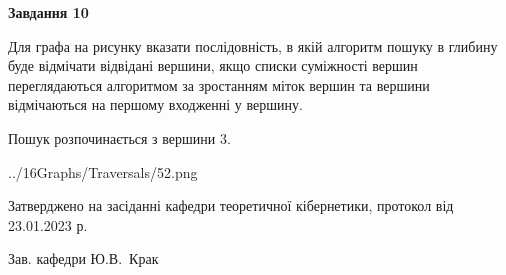 \documentclass[12pt, ukrainian]{article}
\begin{document}
{\begin {large}
{\begin {center}\textbf{Завдання 10}\end {center}}\par
Для графа на рисунку вказати послідовність, в якій алгоритм пошуку в глибину буде відмічати відвідані вершини, якщо списки суміжності вершин переглядаються алгоритмом за зростанням міток вершин та вершини відмічаються на першому вход\-женні у вершину.\par
Пошук розпочинається з вершини 3.\par

\begin{center}
	{../16Graphs/Traversals/52.png}
\end{center}\par
\newpage


\end {large}
}
{\smallskip \begin {small} Затверджено на засіданні кафедри теоретичної кібернетики, протокол  від   23.01.2023 р.\par\smallskip\smallskip
{\parbox {6.5 cm}{Зав. кафедри \dotfill Ю.В.~Крак}} \end{small}}
\end{document}
